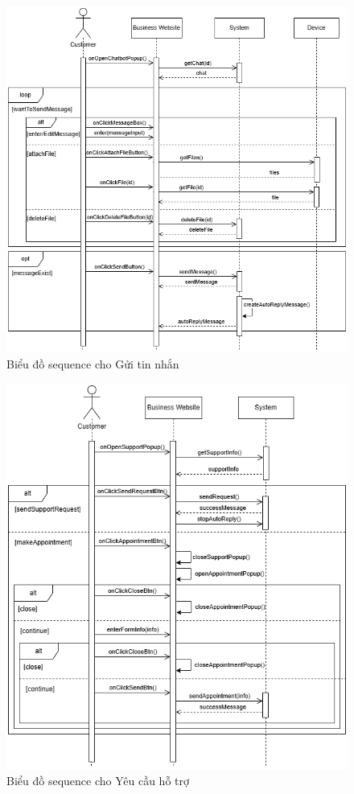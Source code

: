 \begin{figure}[H]
    \centering
     \includegraphics[width=1\textwidth]{Dg_Sequence/SendMessage.png}
    \vspace{0.5cm}
    \caption{Biểu đồ sequence cho Gửi tin nhắn}
    \label{fig:enter-label}
\end{figure}

\begin{figure}[H]
    \centering
     \includegraphics[width=1\textwidth]{Dg_Sequence/NeedSupport.png}
    \vspace{0.5cm}
    \caption{Biểu đồ sequence cho Yêu cầu hỗ trợ}
    \label{fig:enter-label}
\end{figure}
